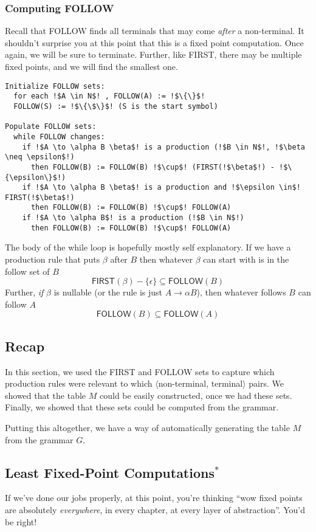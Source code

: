 \subsubsection{Computing FOLLOW}
Recall that \textsf{FOLLOW} finds all terminals that may come \textit{after} a non-terminal. It shouldn't surprise you at this point that this is a fixed point computation. Once again, we will be sure to terminate. Further, like \textsf{FIRST}, there may be multiple fixed points, and we will find the smallest one.

\begin{lstlisting}[style=pseudocode]
Initialize FOLLOW sets:
  for each !$A \in N$! , FOLLOW(A) := !$\{\}$! 
  FOLLOW(S) := !$\{\$\}$! (S is the start symbol) 

Populate FOLLOW sets:
  while FOLLOW changes:
    if !$A \to \alpha B \beta$! is a production (!$B \in N$!, !$\beta \neq \epsilon$!)
      then FOLLOW(B) := FOLLOW(B) !$\cup$! (FIRST(!$\beta$!) - !$\{\epsilon\}$!) 
    if !$A \to \alpha B \beta$! is a production and !$\epsilon \in$! FIRST(!$\beta$!)
      then FOLLOW(B) := FOLLOW(B) !$\cup$! FOLLOW(A) 
    if !$A \to \alpha B$! is a production (!$B \in N$!)
      then FOLLOW(B) := FOLLOW(B) !$\cup$! FOLLOW(A) 
\end{lstlisting}

The body of the while loop is hopefully mostly self explanatory. If we have a production rule that puts $\beta$ after $B$ then whatever $\beta$ can start with is in the follow set of $B$
\[\textsf{FIRST}(\beta) - \{\epsilon\} \subseteq \textsf{FOLLOW}(B)\]
Further, \textit{if} $\beta$ is nullable (or the rule is just $A \to \alpha B$), then whatever follows $B$ can follow $A$
\[\textsf{FOLLOW}(B) \subseteq \textsf{FOLLOW}(A)\]

\subsection{Recap}
In this section, we used the \textsf{FIRST} and \textsf{FOLLOW} sets to capture which production rules were relevant to which $\langle$non-terminal, terminal$\rangle$ pairs. We showed that the table $M$ could be easily constructed, once we had these sets. Finally, we showed that these sets could be computed from the grammar. 

Putting this altogether, we have a way of automatically generating the table $M$ from the grammar $G$.

\subsection{Least Fixed-Point Computations$^*$}\label{section:fixed-point-computations}
If we've done our jobs properly, at this point, you're thinking ``wow fixed points are absolutely \textit{everywhere}, in every chapter, at every layer of abstraction''. You'd be right!

